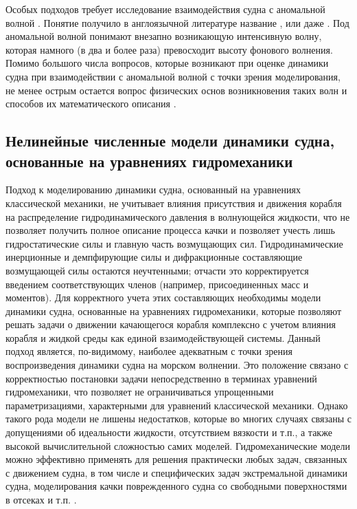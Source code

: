 Особых подходов требует исследование взаимодействия судна с аномальной волной \citep{dk31}. 
Понятие  получило в англоязычной литературе название ,  или даже . 
Под аномальной волной понимают внезапно возникающую интенсивную волну, которая намного (в два и более раза) превосходит высоту фонового волнения. Помимо большого числа вопросов, которые возникают при оценке динамики судна при взаимодействии с аномальной волной с точки зрения моделирования, не менее острым остается вопрос физических основ возникновения таких волн и способов их математического описания \citep{dk32}.

\subsection{Нелинейные численные модели динамики судна, основанные на уравнениях гидромеханики}
Подход к моделированию динамики судна, основанный на уравнениях классической механики, не учитывает влияния присутствия и движения корабля на распределение гидродинамического давления в волнующейся жидкости, что не позволяет получить полное описание процесса качки и позволяет учесть лишь гидростатические силы и главную часть возмущающих сил. Гидродинамические инерционные и демпфирующие силы и дифракционные составляющие возмущающей силы остаются неучтенными; отчасти это корректируется введением соответствующих  членов (например, присоединенных масс и моментов). Для корректного учета этих составляющих  необходимы модели динамики судна, основанные на уравнениях гидромеханики, которые позволяют решать задачи о движении качающегося корабля комплексно с учетом влияния корабля и жидкой среды как единой взаимодействующей системы. Данный подход является, по-видимому, наиболее адекватным с точки зрения воспроизведения динамики судна на морском волнении. Это положение связано с корректностью постановки задачи непосредственно в терминах уравнений гидромеханики, что позволяет не ограничиваться упрощенными параметризациями, характерными для уравнений классической механики. Однако такого рода модели не лишены недостатков, которые во многих случаях связаны с допущениями об идеальности жидкости, отсутствием вязкости и т.п., а также высокой вычислительной сложностью самих моделей. Гидромеханические модели можно эффективно применять для решения практически любых задач, связанных с движением судна, в том числе и специфических задач экстремальной динамики судна, моделирования качки поврежденного судна со свободными поверхностями в отсеках и т.п. \citep{dk33}\citep{dk34}.

